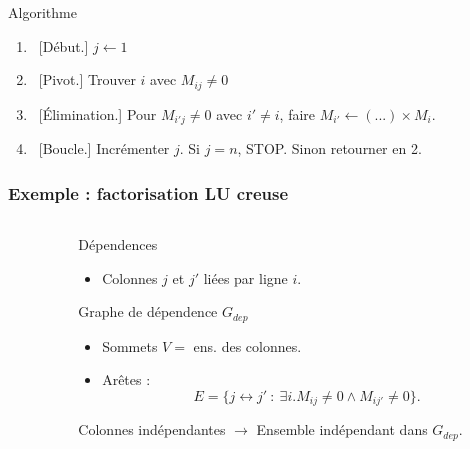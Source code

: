 \documentclass[xcolor={x11names,svgnames},x11names,svgnames]{beamer}
\begin{document}
\begin{frame}[label=sparse_lu_example]
\begin{block}{Algorithme}
  \setlength{\leftmargini}{5mm}
  \begin{enumerate}
  \item~[Début.] $j \gets 1$
  \item~[Pivot.] Trouver $i$ avec $M_{ij} \neq 0$
  \item~[Élimination.] Pour $M_{i'j} \neq 0$ avec $i' \neq i$, faire $M_{i'} \gets (...) \times M_i$.
  \item~[Boucle.] Incrémenter $j$. Si $j=n$, STOP. Sinon retourner en 2.
  \end{enumerate}
\end{block}
\end{frame}


\begin{frame}[label=sparse_lu_MIS]
  \frametitle{Exemple : factorisation LU creuse}

  \begin{columns}
    \begin{column}{0.4\textwidth}
  
\end{column}
\begin{column}{0.6\textwidth}
  \begin{alertblock}{Dépendences}
    \begin{itemize}
    \item Colonnes $j$ et $j'$ liées par ligne $i$.
    \end{itemize}
  \end{alertblock}

  \medskip

  \begin{block}{Graphe de dépendence $G_{dep}$}
    \begin{itemize}
    \item Sommets $V = $ ens. des colonnes.
    \item Arêtes :
      \[
        E = \{ j \leftrightarrow j'~:~ \exists i. M_{ij} \neq 0 \wedge M_{ij'} \neq 0 \}.
      \]
    \end{itemize}
  \end{block}

  \begin{exampleblock}{Colonnes indépendantes}
    $\rightarrow$ Ensemble indépendant dans $G_{dep}$.
  \end{exampleblock}
\end{column}
\end{columns}
\end{frame}
\end{document}

